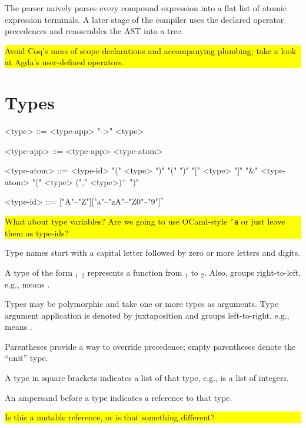 \documentclass{article}
\def\<#1>{\synt{#1}}
\newcommand{\fixme}[1]{
  \noindent\colorbox{yellow}{\parbox{\dimexpr\linewidth-2\fboxsep}{#1}}%
}
\begin{document}
The parser naively parses every compound expression into a flat list of atomic
expression terminals. A later stage of the compiler uses the declared operator
precedences and reassembles the AST into a tree.

\fixme{Avoid Coq's mess of scope declarations and accompanying plumbing; take
a look at Agda's user-defined operators.}

\section{Types}

\setlength{\grammarindent}{6em}
\begin{grammar}
<type> ::= <type-app> "->" <type>

<type-app> ::= <type-app> <type-atom>

<type-atom> ::= <type-id>
\alt "(" <type> ")"
\alt "(" ")"
\alt "[" <type> "]"
\alt "&" <type-atom>
\alt "(" <type> ("," <type>)$^+$ ")"

<type-id> ::= ["A"--"Z"]["a"--"zA"--"Z0"--"9"]$^*$
\end{grammar}

\fixme{What about type variables?  Are we going to use OCaml-style \texttt{'a}
  or just leave them as type-ids?}

Type names start with a capital letter followed by zero or more
letters and digits.

A type of the form \<type>$_1$ \lit*{->} \<type>$_2$ represents a function
from \<type>$_1$ to \<type>$_2$. Also, \lit*{->} groups
right-to-left, e.g.,
 \lit*{->}  \lit*{->} 
means
 \lit*{->} \lit*{(}  \lit*{->}  \lit*{)}.

Types may be polymorphic and take one or more types as arguments.
Type argument application is denoted by juxtaposition and groups
left-to-right, e.g.,
  
means
\lit*{(}   \lit*{)} .

Parentheses provide a way to override precedence; empty parentheses
\lit*{()} denote the ``unit'' type.

A type in square brackets indicates a list of that type, e.g.,
\lit*{[}  \lit*{]} is a list of integers.

An ampersand \lit*{\&} before a type indicates a reference to that type.

\fixme{Is this a mutable reference, or is that something different?}
\end{document}
